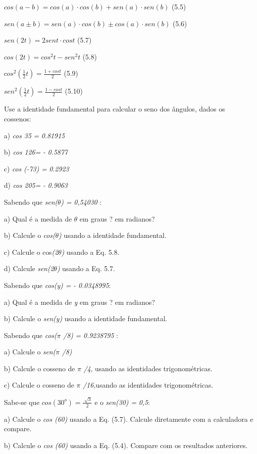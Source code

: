  \( cos \left( a-b \right) =cos \left( a \right)  \cdot cos \left( b \right) +sen \left( a \right)  \cdot sen \left( b \right)  \) \qquad (5.5)

 \( sen \left( a \pm b \right) =sen \left( a \right)  \cdot cos \left( b \right)  \pm cos \left( a \right)  \cdot sen \left( b \right)  \) \qquad (5.6)

 \( sen \left( 2t \right) =2sent \cdot cost \) \qquad (5.7)

 \( cos \left( 2t \right) =cos^{2}t-sen^{2}t \) \qquad (5.8)

 \( cos^{2} \left( \frac{1}{2}t \right) =\frac{1+cost}{2}  \) \qquad (5.9)

 \( sen^{2} \left( \frac{1}{2}t \right) =\frac{1-cost}{2}  \) \qquad (5.10)

\begin{exercicios}
\item Use a identidade fundamental para calcular o seno dos ângulos, dados os cossenos:

    a) \textit{cos 35\degree} \textit{= 0.81915}

    b) \textit{cos 126\degree =} \textit{- 0.5877}

    c) \textit{cos (-73\degree) =} \textit{0.2923}

    d) \textit{cos 205\degree =} \textit{- 0.9063}

\exitem{} Sabendo que \textit{sen($\theta$) =  0,54030} :

    a) Qual é a medida de $\theta$ em graus ? em radianos?

    b) Calcule o  \textit{cos($\theta$)} usando a identidade fundamental.

    c) Calcule o cos\textit{(2$\theta$) } usando a Eq. 5.8.

    d) Calcule  \textit{sen(2$\theta$) }usando a Eq. 5.7.

\exitem{} Sabendo que \textit{cos(y) = - 0.0348995}:

    a) Qual é a medida de \textit{y } em graus ? em radianos?

    b) Calcule o  \textit{sen(y)} usando a identidade fundamental.

\exitem{} Sabendo que \textit{cos($ \pi $ /8)} \textit{= 0.9238795} :

a) Calcule o \textit{sen($ \pi $ /8)}

b) Calcule o cosseno de \textit{$ \pi $ /4}, usando as identidades trigonométricas.

c) Calcule o cosseno de \textit{$ \pi $ /16,}usando as identidades trigonométricas.

\item Sabe-se que  \( cos \left( 30^{o} \right) =\frac{\sqrt[]{3}}{2} \)     e o \textit{sen(30\degree ) = 0,5}:

a) Calcule o \textit{cos (60\degree)} usando a Eq. (5.7). Calcule diretamente com a calculadora e compare.

b)  Calcule o \textit{cos (60\degree)} usando a Eq. (5.4). Compare com os resultados anteriores.
\end{exercicios}

